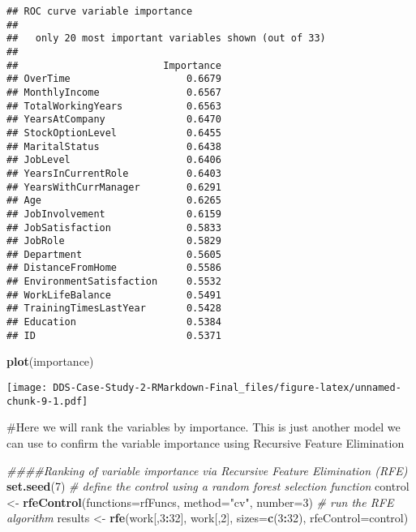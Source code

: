 \documentclass[]{article}
\newenvironment{Shaded}{\begin{snugshade}}{\end{snugshade}}
\newcommand{\CommentTok}[1]{\textcolor[rgb]{0.56,0.35,0.01}{\textit{#1}}}
\newcommand{\DataTypeTok}[1]{\textcolor[rgb]{0.13,0.29,0.53}{#1}}
\newcommand{\DecValTok}[1]{\textcolor[rgb]{0.00,0.00,0.81}{#1}}
\newcommand{\KeywordTok}[1]{\textcolor[rgb]{0.13,0.29,0.53}{\textbf{#1}}}
\newcommand{\NormalTok}[1]{#1}
\newcommand{\OperatorTok}[1]{\textcolor[rgb]{0.81,0.36,0.00}{\textbf{#1}}}
\newcommand{\StringTok}[1]{\textcolor[rgb]{0.31,0.60,0.02}{#1}}
\begin{document}
\begin{verbatim}
## ROC curve variable importance
## 
##   only 20 most important variables shown (out of 33)
## 
##                         Importance
## OverTime                    0.6679
## MonthlyIncome               0.6567
## TotalWorkingYears           0.6563
## YearsAtCompany              0.6470
## StockOptionLevel            0.6455
## MaritalStatus               0.6438
## JobLevel                    0.6406
## YearsInCurrentRole          0.6403
## YearsWithCurrManager        0.6291
## Age                         0.6265
## JobInvolvement              0.6159
## JobSatisfaction             0.5833
## JobRole                     0.5829
## Department                  0.5605
## DistanceFromHome            0.5586
## EnvironmentSatisfaction     0.5532
## WorkLifeBalance             0.5491
## TrainingTimesLastYear       0.5428
## Education                   0.5384
## ID                          0.5371
\end{verbatim}

\begin{Shaded}
\begin{Highlighting}[]
\KeywordTok{plot}\NormalTok{(importance)}
\end{Highlighting}
\end{Shaded}

\texttt{[image: DDS-Case-Study-2-RMarkdown-Final\_files/figure-latex/unnamed-chunk-9-1.pdf]}

\#Here we will rank the variables by importance. This is just another
model we can use to confirm the variable importance using Recursive
Feature Elimination

\begin{Shaded}
\begin{Highlighting}[]
\CommentTok{####Ranking of variable importance via Recursive Feature Elimination (RFE)}
\KeywordTok{set.seed}\NormalTok{(}\DecValTok{7}\NormalTok{)}
\CommentTok{# define the control using a random forest selection function}
\NormalTok{control <-}\StringTok{ }\KeywordTok{rfeControl}\NormalTok{(}\DataTypeTok{functions=}\NormalTok{rfFuncs, }\DataTypeTok{method=}\StringTok{"cv"}\NormalTok{, }\DataTypeTok{number=}\DecValTok{3}\NormalTok{)}
\CommentTok{# run the RFE algorithm}
\NormalTok{results <-}\StringTok{ }\KeywordTok{rfe}\NormalTok{(work[,}\DecValTok{3}\OperatorTok{:}\DecValTok{32}\NormalTok{], work[,}\DecValTok{2}\NormalTok{], }\DataTypeTok{sizes=}\KeywordTok{c}\NormalTok{(}\DecValTok{3}\OperatorTok{:}\DecValTok{32}\NormalTok{), }\DataTypeTok{rfeControl=}\NormalTok{control)}
\end{Highlighting}
\end{Shaded}
\end{document}
